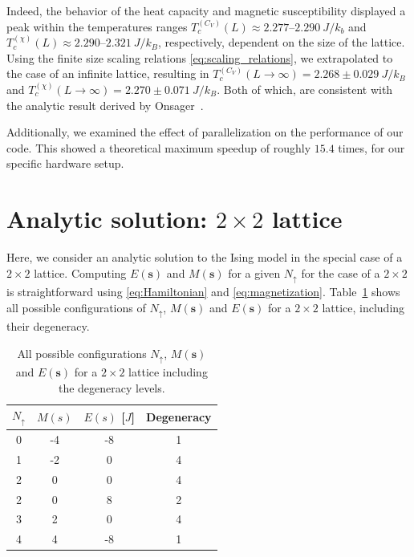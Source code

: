 \documentclass[english,notitlepage,reprint]{revtex4-2}  %
\renewcommand{\vec}[1]{\mathbf{#1}}
\begin{document}
Indeed, the behavior of the heat capacity and magnetic susceptibility displayed a peak within the temperatures ranges \(T_c^{(C_V)}(L)\approx 2.277\text{--}2.290\ \si{J/k_b}\) and \(T_c^{(\chi)}(L)\approx 2.290\text{--}2.321 \ \si{J/k_B}\), respectively, dependent on the size of the lattice.
Using the finite size scaling relations \eqref{eq:scaling_relations}, we extrapolated to the case of an infinite lattice, resulting in \(T^{(C_V)}_c(L\rightarrow\infty) = 2.268 \pm 0.029 \ \si{J/k_B}\) and \(T^{(\chi)}_c(L\rightarrow\infty) = 2.270 \pm 0.071 \ \si{J/k_B}\).
Both of which, are consistent with the analytic result derived by Onsager~\cite{LarsOnsager}.

Additionally, we examined the effect of parallelization on the performance of our code.
This showed a theoretical maximum speedup of roughly \(15.4\) times, for our specific hardware setup. 

\newpage
\clearpage
\onecolumngrid
\appendix

\section{Analytic solution: \(2\times 2\) lattice}  \label{sec:example_2times2lattice}
Here, we consider an analytic solution to the Ising model in the special case of a \(2\times 2\) lattice. 
Computing \(E(\vec{s})\) and \(M(\vec{s})\) for a given \(N_{\uparrow}\) for the case of a \(2\times 2\) is straightforward using \eqref{eq:Hamiltonian} and \eqref{eq:magnetization}. 
Table~\ref{table:2x2_possible_configs} shows all possible configurations of \(N_{\uparrow}\), \(M(\vec{s})\) and \(E(\vec{s})\) for a $2\times 2$ lattice, including their degeneracy.
\begin{table}[h!]
    \centering
    \setlength{\tabcolsep}{4pt}
    \renewcommand{\arraystretch}{1.1}
    \begin{tabular}{c|c|c|c}
    {$N_\uparrow$} & {$M(s)$} & {$E(s)$ [$J$]} & Degeneracy \\
    \hline
        0 &  -4 &  -8 & 1 \\
        1 &  -2 &   0 & 4 \\
        2 &   0 &   0 & 4 \\
        2 &   0 &   8 & 2 \\
        3 &   2 &   0 & 4 \\
        4 &   4 &  -8 & 1 \\
    \end{tabular}
    \caption{All possible configurations \(N_{\uparrow}\), \(M(\vec{s})\) and \(E(\vec{s})\) for a $2\times 2$ lattice including the degeneracy levels. }
    \label{table:2x2_possible_configs}
\end{table}
\end{document}

